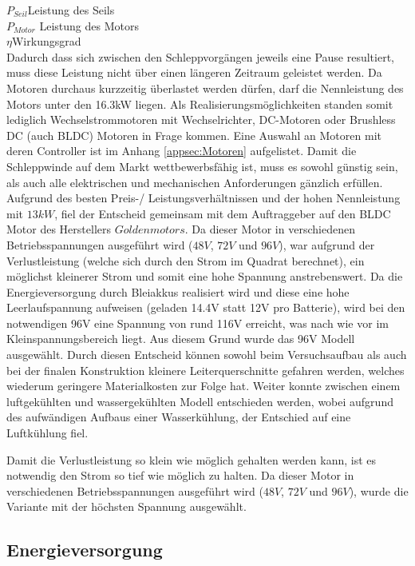 $ P_{Seil} $\quad 	Leistung des Seils     \\
$ P_{Motor} $  Leistung des Motors    \\
$ \eta $\qquad  Wirkungsgrad     \\

Dadurch dass sich zwischen den Schleppvorgängen jeweils eine Pause resultiert, muss diese Leistung nicht über einen längeren Zeitraum geleistet werden. Da Motoren durchaus kurzzeitig überlastet werden dürfen, darf die Nennleistung des Motors unter den 16.3kW liegen. Als Realisierungsmöglichkeiten standen somit lediglich Wechselstrommotoren mit Wechselrichter, DC-Motoren oder Brushless DC (auch BLDC) Motoren in Frage kommen. Eine Auswahl an Motoren mit deren Controller ist im Anhang \ref{appsec:Motoren} aufgelistet.
Damit die Schleppwinde auf dem Markt wettbewerbsfähig ist, muss es sowohl günstig sein, als auch alle elektrischen und mechanischen Anforderungen gänzlich erfüllen. Aufgrund des besten Preis-/ Leistungsverhältnissen und der hohen Nennleistung mit $ 13kW $, fiel der Entscheid gemeinsam mit dem Auftraggeber auf den BLDC Motor des Herstellers $ Goldenmotors $. Da dieser Motor in verschiedenen Betriebsspannungen ausgeführt wird ($ 48V $, $ 72V $ und $ 96V $), war aufgrund der Verlustleistung (welche sich durch den Strom im Quadrat berechnet), ein möglichst kleinerer Strom und somit eine hohe Spannung anstrebenswert. Da die Energieversorgung durch Bleiakkus realisiert wird und diese eine hohe Leerlaufspannung aufweisen (geladen 14.4V statt 12V pro Batterie), wird bei den notwendigen 96V eine Spannung von rund 116V erreicht, was nach wie vor im Kleinspannungsbereich liegt. Aus diesem Grund wurde das 96V Modell ausgewählt. Durch diesen Entscheid können sowohl beim Versuchsaufbau als auch bei der finalen Konstruktion kleinere Leiterquerschnitte gefahren werden, welches wiederum geringere Materialkosten zur Folge hat. Weiter konnte zwischen einem luftgekühlten und wassergekühlten Modell entschieden werden, wobei aufgrund des aufwändigen Aufbaus einer Wasserkühlung, der Entschied auf eine Luftkühlung fiel.  

Damit die Verlustleistung so klein wie möglich gehalten werden kann, ist es notwendig den Strom so tief wie möglich zu halten. Da dieser Motor in verschiedenen Betriebsspannungen ausgeführt wird ($ 48V $, $ 72V $ und $ 96V $), wurde die Variante mit der höchsten Spannung ausgewählt. 

\subsection{Energieversorgung}\label{subsec:Energieversorgung}

